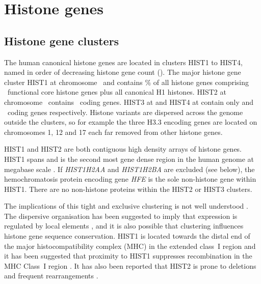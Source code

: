 \section{Histone genes}

  \subsection{Histone gene clusters}
    The human canonical histone genes are located in clusters HIST1 to HIST4, 
	named in order of decreasing histone gene count ().
	The major histone gene cluster HIST1 at chromosome~\HISTOneLocus{} and 
	contains \% of all histone genes 
	comprising \CodingGenesInHISTOne{}~functional core histone genes plus all canonical H1 histones. 
	HIST2 at chromosome~\HISTTwoLocus{} contains \CodingGenesInHISTTwo{}~coding genes. 
	HIST3 at \HISTThreeLocus{} and HIST4 at \HISTFourLocus{}
	contain only \CodingGenesInHISTThree{} and \CodingGenesInHISTFour{}~coding genes respectively. 
	Histone variants are dispersed across the genome outside the clusters, 
	so for example the three H3.3 encoding genes are located on chromosomes 1, 12 and 17 
	each far removed from other histone genes.

	HIST1 and HIST2 are both contiguous high density arrays of histone genes. 
	HIST1 spans \HISTOneSpan{} 
	and is the second most gene dense region in the human genome at megabase scale \citep{MHC-III-analysis}.
	If \textit{HIST1H2AA} and \textit{HIST1H2BA} are excluded (see below), 
	the hemochromatosis protein encoding gene \textit{HFE} is the sole non-histone gene within HIST1. 
	There are no non-histone proteins within the HIST2 or HIST3 clusters. 

	The implications of this tight and exclusive clustering is not well understood . 
	The dispersive organisation has been suggested to imply that expression is regulated by local elements \citep{close-regulators}, 
	and it is also possible that clustering influences histone gene sequence conservation. 
	HIST1 is located towards the distal end of the major histocompatibility complex (MHC) in the extended class~I region \citep{MHC-I-transcript, MHC-complete-sequencing-1999} 
	and it has been suggested that proximity to HIST1 suppresses recombination in the MHC Class~I region \citep{MHC-repressed-by-HIST}. 
	It has also been reported that HIST2 is prone to deletions and frequent rearrangements \citep{HISTTwo-prone-deletion-discovery, HISTTwo-prone-deletion-focus}. 

